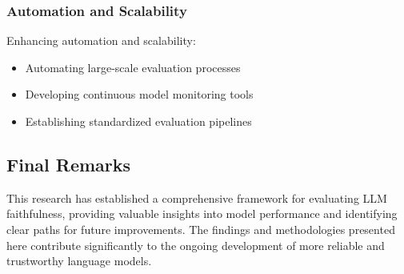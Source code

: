\subsubsection{Automation and Scalability}
Enhancing automation and scalability:
\begin{itemize}
    \item Automating large-scale evaluation processes
    \item Developing continuous model monitoring tools
    \item Establishing standardized evaluation pipelines
\end{itemize}

\subsection{Final Remarks}
This research has established a comprehensive framework for evaluating LLM faithfulness, providing valuable insights into model performance and identifying clear paths for future improvements. The findings and methodologies presented here contribute significantly to the ongoing development of more reliable and trustworthy language models.


